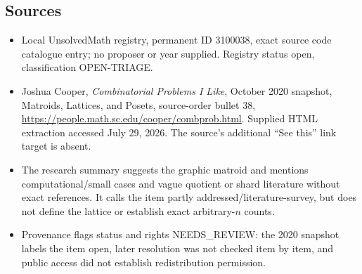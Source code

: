 \documentclass[11pt]{article}
\begin{document}
\subsection{Sources}
\begin{itemize}
\item Local UnsolvedMath registry, permanent ID 3100038, exact source code catalogue entry; no proposer or year supplied. Registry status open, classification OPEN-TRIAGE.
\item Joshua Cooper, \emph{Combinatorial Problems I Like}, October 2020 snapshot, Matroids, Lattices, and Posets, source-order bullet 38, \url{https://people.math.sc.edu/cooper/combprob.html}. Supplied HTML extraction accessed July 29, 2026. The source's additional ``See this'' link target is absent.
\item The research summary suggests the graphic matroid and mentions computational/small cases and vague quotient or shard literature without exact references. It calls the item partly addressed/literature-survey, but does not define the lattice or establish exact arbitrary-$n$ counts.
\item Provenance flags status and rights NEEDS\_REVIEW: the 2020 snapshot labels the item open, later resolution was not checked item by item, and public access did not establish redistribution permission.
\end{itemize}
\end{document}
